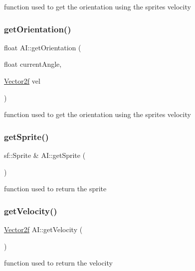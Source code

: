 function used to get the orientation using the sprites velocity \mbox{\label{class_a_i_a1811108f5cf63c3735bd68064c59fd45}} 
\subsubsection{\texorpdfstring{getOrientation()}{getOrientation()}}
{\footnotesize\ttfamily float A\+I\+::get\+Orientation (\begin{DoxyParamCaption}\item[{float}]{current\+Angle,  }\item[{\mbox{\hyperlink{class_vector2f}{Vector2f}}}]{vel }\end{DoxyParamCaption})\hspace{0.3cm}{\ttfamily [static]}}

function used to get the orientation using the sprites velocity \mbox{\label{class_a_i_a2d820861174c0e16c7db9b8576cfe7ae}} 
\subsubsection{\texorpdfstring{getSprite()}{getSprite()}}
{\footnotesize\ttfamily sf\+::\+Sprite \& A\+I\+::get\+Sprite (\begin{DoxyParamCaption}{ }\end{DoxyParamCaption})}

function used to return the sprite \mbox{\label{class_a_i_a17308d8d0aee28ede770a40407f7f718}} 
\subsubsection{\texorpdfstring{getVelocity()}{getVelocity()}}
{\footnotesize\ttfamily \mbox{\hyperlink{class_vector2f}{Vector2f}} A\+I\+::get\+Velocity (\begin{DoxyParamCaption}{ }\end{DoxyParamCaption})}

function used to return the velocity \mbox{\label{class_a_i_a7d2082a5c1692991512725797346705f}} 
